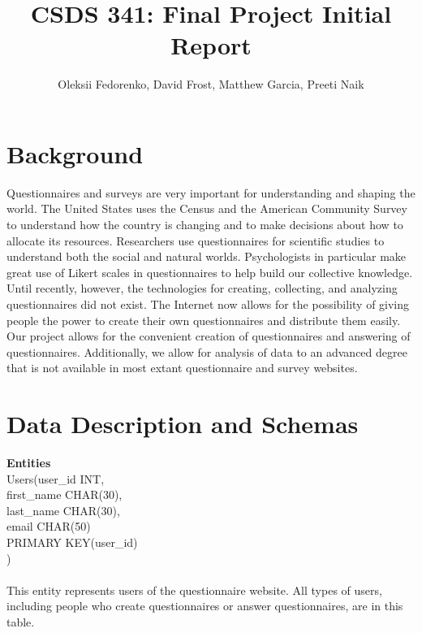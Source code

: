 \documentclass[12pt, oneside, a4paper]{article}
\title{CSDS 341: Final Project Initial Report}
\author{Oleksii Fedorenko, David Frost, Matthew Garcia, Preeti Naik}
\begin{document}
    \maketitle
    \section{Background}
    Questionnaires and surveys are very important for understanding and shaping the world. The United States uses the Census and the
    American Community Survey to understand how the country is changing and to make decisions about how to allocate its
    resources. Researchers use questionnaires for scientific studies to understand both the social and natural worlds.
    Psychologists in particular make great use of Likert scales in questionnaires to help build our collective knowledge.
    Until recently, however, the technologies for creating, collecting, and analyzing questionnaires did not exist.
    The Internet now allows for the possibility of giving people the power to create their own questionnaires and distribute
    them easily. Our project allows for the convenient creation of questionnaires and answering of questionnaires. Additionally,
    we allow for analysis of data to an advanced degree that is not available in most extant questionnaire and survey websites.
    \section{Data Description and Schemas}
    \textbf{Entities}
    \\
    Users(user\_id       INT,\\
          first\_name    CHAR(30),\\
          last\_name     CHAR(30),\\
          email         CHAR(50)\\
          PRIMARY KEY(user\_id)\\
    )
    \\
    \\
    This entity represents users of the questionnaire website.
    All types of users, including people who create questionnaires
    or answer questionnaires, are in this table.
\end{document}
